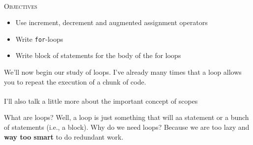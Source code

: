 \newpage{}\\
\textsc{Objectives}
\begin{itemize}
\item Use increment, decrement and augmented assignment operators
\item Write \texttt{for}-loops
\item Write block of statements for the body of the for loops
\end{itemize}
We'll now begin our study of loops. I've already many times that a loop allows you to repeat the execution of a chunk of code.\\\\
I'll also talk a little more about the important concept of scopes
     
\newpage{}

What are loops? Well, a loop is just something that will  aa statement or a bunch of statements (i.e., a block).
Why do we need loops? Because we are too lazy and \textbf{way too smart} to do redundant work.

